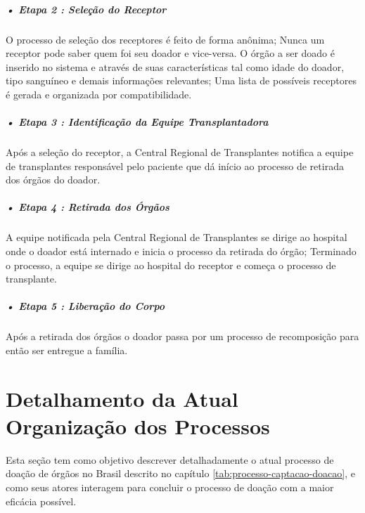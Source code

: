 \documentclass[portuguese,oneside]{tcc}
\begin{document}
\subparagraph{• Etapa 2 : Seleção do Receptor}
O processo de seleção dos receptores é feito de forma anônima; Nunca um receptor pode saber quem foi seu doador e vice-versa. O órgão a ser doado é inserido no sistema e através de suas características tal como idade do doador, tipo sanguíneo e demais informações relevantes; Uma lista de possíveis receptores é gerada e organizada por compatibilidade.

\subparagraph{• Etapa 3 : Identificação da Equipe Transplantadora}
Após a seleção do receptor, a Central Regional de Transplantes notifica a equipe de transplantes responsável pelo paciente que dá início ao processo de retirada dos órgãos do doador.

\subparagraph{• Etapa 4 : Retirada dos Órgãos}
A equipe notificada pela Central Regional de Transplantes se dirige ao hospital onde o doador está internado e inicia o processo da retirada do órgão; Terminado o processo, a equipe se dirige ao hospital do receptor e começa o processo de transplante.

\subparagraph{• Etapa 5 : Liberação do Corpo}
Após a retirada dos órgãos o doador passa por um processo de recomposição para então ser entregue a família.


\section{Detalhamento da Atual Organização dos Processos}  \label{tab:detalhamento-atual}
Esta seção tem como objetivo descrever detalhadamente o atual processo de doação de órgãos no Brasil descrito no capítulo \ref{tab:processo-captacao-doacao}, e como seus atores interagem para concluir o processo de doação com a maior eficácia possível.
\end{document}
